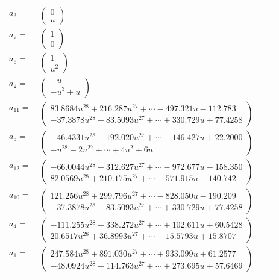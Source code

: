 \documentclass[1p]{elsarticle_modified}
\theoremstyle{definition}
\begin{document}
\begin{tabular}{m{7pt} m{180pt} m{7pt} m{180pt} }
\flushright $a_{3}=$&$\begin{pmatrix}0\\u\end{pmatrix}$ \\
\flushright $a_{7}=$&$\begin{pmatrix}1\\0\end{pmatrix}$ \\
\flushright $a_{6}=$&$\begin{pmatrix}1\\u^2\end{pmatrix}$ \\
\flushright $a_{2}=$&$\begin{pmatrix}- u\\- u^3+u\end{pmatrix}$ \\
\flushright $a_{11}=$&$\begin{pmatrix}83.8684 u^{28}+216.287 u^{27}+\cdots-497.321 u-112.783\\-37.3878 u^{28}-83.5093 u^{27}+\cdots+330.729 u+77.4258\end{pmatrix}$ \\
\flushright $a_{5}=$&$\begin{pmatrix}-46.4331 u^{28}-192.020 u^{27}+\cdots-146.427 u+22.2000\\- u^{28}-2 u^{27}+\cdots+4 u^2+6 u\end{pmatrix}$ \\
\flushright $a_{12}=$&$\begin{pmatrix}-66.0044 u^{28}-312.627 u^{27}+\cdots-972.677 u-158.350\\82.0569 u^{28}+210.175 u^{27}+\cdots-571.915 u-140.742\end{pmatrix}$ \\
\flushright $a_{10}=$&$\begin{pmatrix}121.256 u^{28}+299.796 u^{27}+\cdots-828.050 u-190.209\\-37.3878 u^{28}-83.5093 u^{27}+\cdots+330.729 u+77.4258\end{pmatrix}$ \\
\flushright $a_{4}=$&$\begin{pmatrix}-111.255 u^{28}-338.272 u^{27}+\cdots+102.611 u+60.5428\\20.6517 u^{28}+36.8993 u^{27}+\cdots-15.5793 u+15.8707\end{pmatrix}$ \\
\flushright $a_{1}=$&$\begin{pmatrix}247.584 u^{28}+891.030 u^{27}+\cdots+933.099 u+61.2577\\-48.0924 u^{28}-114.763 u^{27}+\cdots+273.695 u+57.6469\end{pmatrix}$ \\

\end{tabular}
\end{document}
